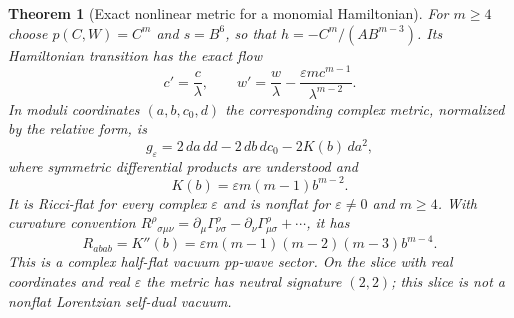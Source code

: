 \documentclass[aps,prd,reprint,nofootinbib,superscriptaddress]{revtex4-2}
\newtheorem{theorem}{Theorem}[section]
\theoremstyle{definition}
\theoremstyle{remark}
\newcommand{\eps}{\varepsilon}
\begin{document}
\begin{theorem}[Exact nonlinear metric for a monomial Hamiltonian]
\label{thm:ExactMetric}
For $m\ge4$ choose $p(C,W)=C^m$ and $s=B^6$, so that $h=-C^m/(AB^{m-3})$. Its Hamiltonian transition has the exact flow
\begin{equation}
c'=\frac c\lambda,\qquad
w'=\frac w\lambda-\frac{\eps m c^{m-1}}{\lambda^{m-2}}.
\label{eq:MonomialGluing}
\end{equation}
In moduli coordinates $(a,b,c_0,d)$ the corresponding complex metric, normalized by the relative form, is
\begin{equation}
\boxed{\quad g_\eps=2\,da\,dd-2\,db\,dc_0
-2K(b)\,da^2,\quad}
\label{eq:ExactSeedMetric}
\end{equation}
where symmetric differential products are understood and
\begin{equation}
K(b)=\eps m(m-1)b^{m-2}.
\label{eq:ExactSeedProfile}
\end{equation}
It is Ricci-flat for every complex $\eps$ and is nonflat for $\eps\ne0$ and $m\ge4$. With curvature convention
$R^\rho{}_{\sigma\mu\nu}=\partial_\mu\Gamma^\rho_{\nu\sigma}-\partial_\nu\Gamma^\rho_{\mu\sigma}+\cdots$, it has
\begin{equation}
R_{abab}=K''(b)
=\eps m(m-1)(m-2)(m-3)b^{m-4}.
\label{eq:ExactSeedCurvature}
\end{equation}
This is a complex half-flat vacuum pp-wave sector. On the slice with real coordinates and real $\eps$ the metric has neutral signature $(2,2)$; this slice is not a nonflat Lorentzian self-dual vacuum.
\end{theorem}
\end{document}
